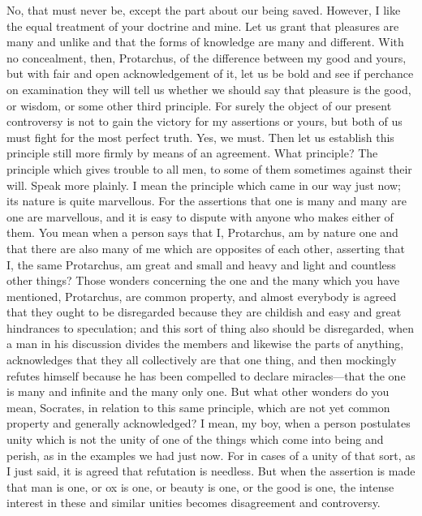 \documentclass[letterpaper,12pt]{article}
\newcommand{\stephpag}[1]{\marginnote{\small\itshape\fontfamily{ppl}\selectfont #1}}
\begin{document}
\begin{drama}
\protarchusspeaks
No, that must never be, except the part about our being saved. However, I like the equal treatment of your doctrine and mine. Let us grant that pleasures are many and unlike and that the forms of knowledge are many and different. \stephpag{b}
\socratesspeaks
With no concealment, then, Protarchus, of the difference between my good and yours, but with fair and open acknowledgement of it, let us be bold and see if perchance on examination they will tell us whether we should say that pleasure is the good, or wisdom, or some other third principle. For surely the object of our present controversy is not to gain the victory for my assertions or yours, but both of us must fight for the most perfect truth.
\protarchusspeaks
Yes, we must.
\socratesspeaks
Then let us establish this principle still more firmly \stephpag{c} by means of an agreement.
\protarchusspeaks
What principle?
\socratesspeaks
The principle which gives trouble to all men, to some of them sometimes against their will.
\protarchusspeaks
Speak more plainly.
\socratesspeaks
I mean the principle which came in our way just now; its nature is quite marvellous. For the assertions that one is many and many are one are marvellous, and it is easy to dispute with anyone who makes either of them.
\protarchusspeaks
You mean when a person says that I, Protarchus, \stephpag{d} am by nature one and that there are also many of me which are opposites of each other, asserting that I, the same Protarchus, am great and small and heavy and light and countless other things?
\socratesspeaks
Those wonders concerning the one and the many which you have mentioned, Protarchus, are common property, and almost everybody is agreed that they ought to be disregarded because they are childish and easy and great hindrances to speculation; and this sort of thing also should be disregarded, \stephpag{e} when a man in his discussion divides the members and likewise the parts of anything, acknowledges that they all collectively are that one thing, and then mockingly refutes himself because he has been compelled to declare miracles---that the one is many and infinite and the many only one.
\protarchusspeaks
But what other wonders do you mean, Socrates, in relation to this same principle, which are not yet common property and generally acknowledged? \stephpag{15 a}
\socratesspeaks
I mean, my boy, when a person postulates unity which is not the unity of one of the things which come into being and perish, as in the examples we had just now. For in cases of a unity of that sort, as I just said, it is agreed that refutation is needless. But when the assertion is made that man is one, or ox is one, or beauty is one, or the good is one, the intense interest in these and similar unities becomes disagreement and controversy.

\end{drama}
\end{document}
